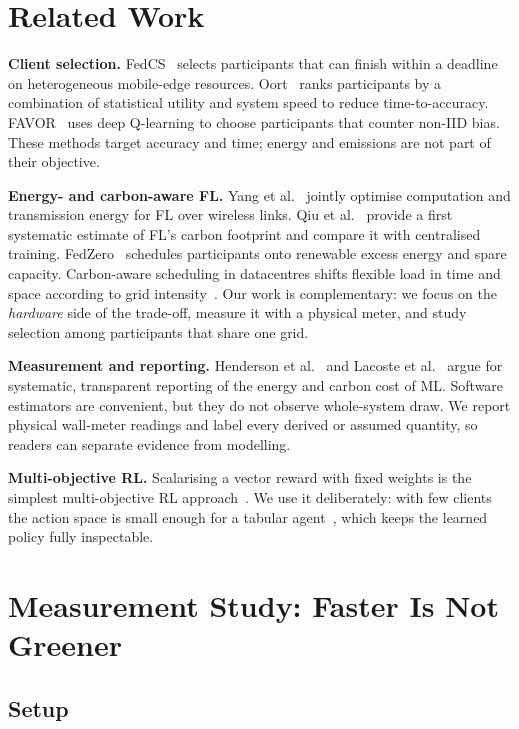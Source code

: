 \documentclass[conference]{IEEEtran}
\begin{document}
\section{Related Work}

\textbf{Client selection.} FedCS~\cite{nishio2019client} selects participants that can finish within a deadline on heterogeneous mobile-edge resources. Oort~\cite{lai2021oort} ranks participants by a combination of statistical utility and system speed to reduce time-to-accuracy. FAVOR~\cite{wang2020favor} uses deep Q-learning to choose participants that counter non-IID bias. These methods target accuracy and time; energy and emissions are not part of their objective.

\textbf{Energy- and carbon-aware FL.} Yang et al.~\cite{yang2021energy} jointly optimise computation and transmission energy for FL over wireless links. Qiu et al.~\cite{qiu2023carbon} provide a first systematic estimate of FL's carbon footprint and compare it with centralised training. FedZero~\cite{wiesner2024fedzero} schedules participants onto renewable excess energy and spare capacity. Carbon-aware scheduling in datacentres shifts flexible load in time and space according to grid intensity~\cite{radovanovic2023carbon}. Our work is complementary: we focus on the \emph{hardware} side of the trade-off, measure it with a physical meter, and study selection among participants that share one grid.

\textbf{Measurement and reporting.} Henderson et al.~\cite{henderson2020systematic} and Lacoste et al.~\cite{lacoste2019quantifying} argue for systematic, transparent reporting of the energy and carbon cost of ML. Software estimators are convenient, but they do not observe whole-system draw. We report physical wall-meter readings and label every derived or assumed quantity, so readers can separate evidence from modelling.

\textbf{Multi-objective RL.} Scalarising a vector reward with fixed weights is the simplest multi-objective RL approach~\cite{hayes2022morl}. We use it deliberately: with few clients the action space is small enough for a tabular agent~\cite{watkins1992qlearning}, which keeps the learned policy fully inspectable.

\section{Measurement Study: Faster Is Not Greener}\label{sec:measure}

\subsection{Setup}
\end{document}
